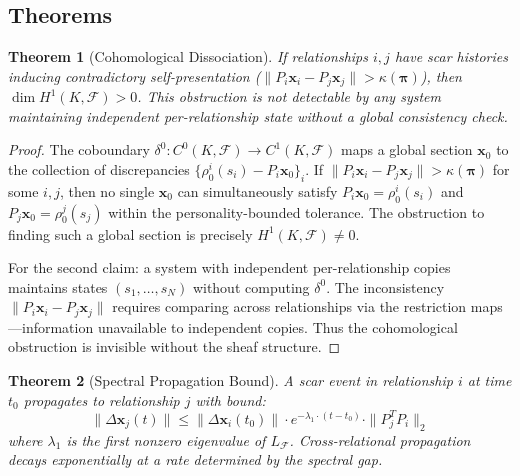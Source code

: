\documentclass[11pt]{article}
\newtheorem{theorem}{Theorem}[section]
\begin{document}
\subsection{Theorems}

\begin{theorem}[Cohomological Dissociation]
\label{thm:sheaf-dissociation}
If relationships $i, j$ have scar histories inducing contradictory self-presentation ($\|P_i \mathbf{x}_i - P_j \mathbf{x}_j\| > \kappa(\boldsymbol{\pi})$), then $\dim H^1(K, \mathcal{F}) > 0$. This obstruction is not detectable by any system maintaining independent per-relationship state without a global consistency check.
\end{theorem}

\begin{proof}
The coboundary $\delta^0: C^0(K, \mathcal{F}) \to C^1(K, \mathcal{F})$ maps a global section $\mathbf{x}_0$ to the collection of discrepancies $\{\rho_0^i(s_i) - P_i \mathbf{x}_0\}_{i}$. If $\|P_i \mathbf{x}_i - P_j \mathbf{x}_j\| > \kappa(\boldsymbol{\pi})$ for some $i, j$, then no single $\mathbf{x}_0$ can simultaneously satisfy $P_i \mathbf{x}_0 = \rho_0^i(s_i)$ and $P_j \mathbf{x}_0 = \rho_0^j(s_j)$ within the personality-bounded tolerance. The obstruction to finding such a global section is precisely $H^1(K, \mathcal{F}) \neq 0$.

For the second claim: a system with independent per-relationship copies maintains states $(s_1, \ldots, s_N)$ without computing $\delta^0$. The inconsistency $\|P_i \mathbf{x}_i - P_j \mathbf{x}_j\|$ requires comparing across relationships via the restriction maps---information unavailable to independent copies. Thus the cohomological obstruction is invisible without the sheaf structure.
\end{proof}

\begin{theorem}[Spectral Propagation Bound]
\label{thm:sheaf-spectral}
A scar event in relationship $i$ at time $t_0$ propagates to relationship $j$ with bound:
\begin{equation}
\|\Delta \mathbf{x}_j(t)\| \leq \|\Delta \mathbf{x}_i(t_0)\| \cdot e^{-\lambda_1 \cdot (t - t_0)} \cdot \|P_j^T P_i\|_2
\end{equation}
where $\lambda_1$ is the first nonzero eigenvalue of $L_\mathcal{F}$. Cross-relational propagation decays exponentially at a rate determined by the spectral gap.
\end{theorem}
\end{document}
